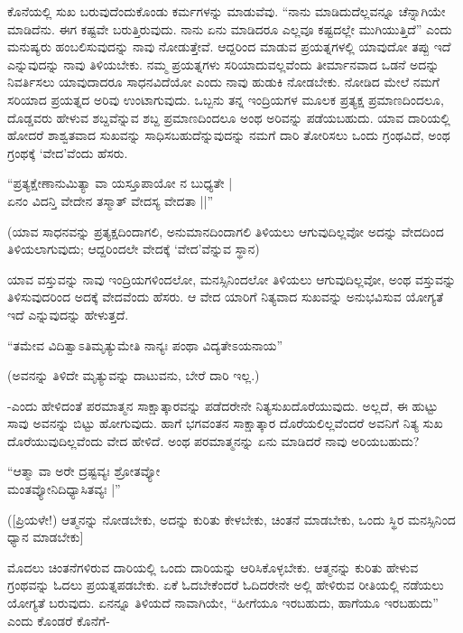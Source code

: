 ಕೊನೆಯಲ್ಲಿ ಸುಖ ಬರುವುದೆಂದುಕೊಂಡು ಕರ್ಮಗಳನ್ನು ಮಾಡುವೆವು. ``ನಾನು ಮಾಡಿದುದೆಲ್ಲವನ್ನೂ ಚೆನ್ನಾಗಿಯೇ ಮಾಡಿದೆನು. ಈಗ ಕಷ್ಟವೇ ಬರುತ್ತಿರುವುದು. ನಾನು ಏನು ಮಾಡಿದರೂ ಎಲ್ಲವೂ ಕಷ್ಟದಲ್ಲೇ ಮುಗಿಯುತ್ತಿದೆ'' ಎಂದು ಮನುಷ್ಯರು ಹಂಬಲಿಸುವುದನ್ನು ನಾವು ನೋಡುತ್ತೇವೆ. ಆದ್ದರಿಂದ ಮಾಡುವ ಪ್ರಯತ್ನಗಳಲ್ಲಿ ಯಾವುದೋ ತಪ್ಪು ಇದೆ ಎನ್ನುವುದನ್ನು ನಾವು ತಿಳಿಯಬೇಕು. ನಮ್ಮ ಪ್ರಯತ್ನಗಳು ಸರಿಯಾದುವಲ್ಲವೆಂದು ತೀರ್ಮಾನವಾದ ಒಡನೆ ಅದನ್ನು ನಿವರ್ತಿಸಲು ಯಾವುದಾದರೂ ಸಾಧನವಿದೆಯೋ ಎಂದು ನಾವು ಹುಡುಕಿ ನೋಡಬೇಕು. ನೋಡಿದ ಮೇಲೆ ನಮಗೆ ಸರಿಯಾದ ಪ್ರಯತ್ನದ ಅರಿವು ಉಂಟಾಗುವುದು. ಒಬ್ಬನು ತನ್ನ ಇಂದ್ರಿಯಗಳ ಮೂಲಕ ಪ್ರತ್ಯಕ್ಷ ಪ್ರಮಾಣದಿಂದಲೂ, ದೊಡ್ಡವರು ಹೇಳುವ ಶಬ್ದವೆನ್ನುವ ಶಬ್ದ ಪ್ರಮಾಣದಿಂದಲೂ ಅಂಥ ಅರಿವನ್ನು ಪಡೆಯಬಹುದು. ಯಾವ ದಾರಿಯಲ್ಲಿ ಹೋದರೆ ಶಾಶ್ವತವಾದ ಸುಖವನ್ನು ಸಾಧಿಸಬಹುದೆನ್ನುವುದನ್ನು ನಮಗೆ ದಾರಿ ತೋರಿಸಲು ಒಂದು ಗ್ರಂಥವಿದೆ, ಅಂಥ ಗ್ರಂಥಕ್ಕೆ `ವೇದ'ವೆಂದು ಹೆಸರು.

\begin{shloka}
``ಪ್ರತ್ಯಕ್ಷೇಣಾನುಮಿತ್ಯಾ ವಾ ಯಸ್ತೂಪಾಯೋ ನ ಬುಧ್ಯತೇ |\\
ಏನಂ ವಿದನ್ತಿ ವೇದೇನ ತಸ್ಮಾತ್ ವೇದಸ್ಯ ವೇದತಾ ||''
\end{shloka}

(ಯಾವ ಸಾಧನವನ್ನು ಪ್ರತ್ಯಕ್ಷದಿಂದಾಗಲಿ, ಅನುಮಾನದಿಂದಾಗಲಿ ತಿಳಿಯಲು ಆಗುವುದಿಲ್ಲವೋ ಅದನ್ನು ವೇದದಿಂದ ತಿಳಿಯಲಾಗುವುದು; ಆದ್ದರಿಂದಲೇ ವೇದಕ್ಕೆ `ವೇದ'ವೆನ್ನುವ ಸ್ಥಾನ)

ಯಾವ ವಸ್ತುವನ್ನು ನಾವು ಇಂದ್ರಿಯಗಳಿಂದಲೋ, ಮನಸ್ಸಿನಿಂದಲೋ ತಿಳಿಯಲು ಆಗುವುದಿಲ್ಲವೋ, ಅಂಥ ವಸ್ತುವನ್ನು ತಿಳಿಸುವುದರಿಂದ ಅದಕ್ಕೆ ವೇದವೆಂದು ಹೆಸರು. ಆ ವೇದ ಯಾರಿಗೆ ನಿತ್ಯವಾದ ಸುಖವನ್ನು ಅನುಭವಿಸುವ ಯೋಗ್ಯತೆ ಇದೆ ಎನ್ನುವುದನ್ನು ಹೇಳುತ್ತದೆ.

\begin{shloka}
``ತಮೇವ ವಿದಿತ್ವಾಽತಿಮೃತ್ಯುಮೇತಿ ನಾನ್ಯಃ ಪಂಥಾ ವಿದ್ಯತೇಽಯನಾಯ''
\end{shloka}

(ಅವನನ್ನು ತಿಳಿದೇ ಮೃತ್ಯುವನ್ನು ದಾಟುವನು, ಬೇರೆ ದಾರಿ ಇಲ್ಲ.)

-ಎಂದು ಹೇಳಿದಂತೆ ಪರಮಾತ್ಮನ ಸಾಕ್ಷಾತ್ಕಾರವನ್ನು ಪಡೆದರೇನೇ ನಿತ್ಯಸುಖದೊರೆಯುವುದು. ಅಲ್ಲದೆ, ಈ ಹುಟ್ಟು ಸಾವು ಅವನನ್ನು ಬಿಟ್ಟು ಹೋಗುವುದು. ಹಾಗೆ ಭಗವಂತನ ಸಾಕ್ಷಾತ್ಕಾರ ದೊರೆಯಲಿಲ್ಲವೆಂದರೆ ಅವನಿಗೆ ನಿತ್ಯ ಸುಖ ದೊರೆಯುವುದಿಲ್ಲವೆಂದು ವೇದ ಹೇಳಿದೆ. ಅಂಥ ಪರಮಾತ್ಮನನ್ನು ಏನು ಮಾಡಿದರೆ ನಾವು ಅರಿಯಬಹುದು?

\begin{shloka}
``ಆತ್ಮಾ ವಾ ಅರೇ ದ್ರಷ್ಟವ್ಯಃ ಶ್ರೋತವ್ಯೋ\\
ಮಂತವ್ಯೋನಿದಿಧ್ಯಾಸಿತವ್ಯಃ |''
\end{shloka}

([ಪ್ರಿಯಳೇ!) ಆತ್ಮನನ್ನು ನೋಡಬೇಕು, ಅದನ್ನು ಕುರಿತು ಕೇಳಬೇಕು, ಚಿಂತನೆ ಮಾಡಬೇಕು, ಒಂದು ಸ್ಥಿರ ಮನಸ್ಸಿನಿಂದ ಧ್ಯಾನ ಮಾಡಬೇಕು]

ಮೊದಲು ಚಿಂತನೆಗಳಿರುವ ದಾರಿಯಲ್ಲಿ ಒಂದು ದಾರಿಯನ್ನು ಆರಿಸಿಕೊಳ್ಳಬೇಕು. ಆತ್ಮನನ್ನು ಕುರಿತು ಹೇಳುವ ಗ್ರಂಥವನ್ನು ಓದಲು ಪ್ರಯತ್ನಪಡಬೇಕು. ಏಕೆ ಓದಬೇಕೆಂದರೆ ಓದಿದರೇನೇ ಅಲ್ಲಿ ಹೇಳಿರುವ ರೀತಿಯಲ್ಲಿ ನಡೆಯಲು ಯೋಗ್ಯತೆ ಬರುವುದು. ಏನನ್ನೂ ತಿಳಿಯದೆ ನಾವಾಗಿಯೇ, ``ಹೀಗೆಯೂ ಇರಬಹುದು, ಹಾಗೆಯೂ ಇರಬಹುದು'' ಎಂದು ಕೊಂಡರೆ ಕೊನೆಗೆ-

